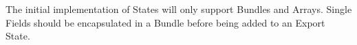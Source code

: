 %


The initial implementation of States will only support Bundles and
Arrays.  Single Fields should be encapsulated in a Bundle before
being added to an Export State.



